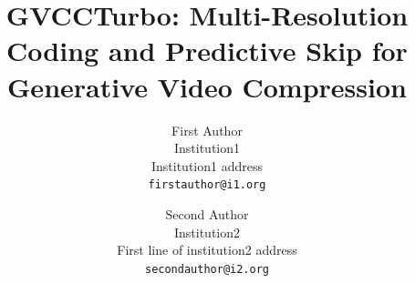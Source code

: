 \documentclass[10pt,twocolumn,letterpaper]{article}
\title{GVCCTurbo: Multi-Resolution Coding and Predictive Skip for Generative Video Compression}
\author{First Author\\
Institution1\\
Institution1 address\\
{\tt\small firstauthor@i1.org}
\and
Second Author\\
Institution2\\
First line of institution2 address\\
{\tt\small secondauthor@i2.org}
}
\begin{document}
\maketitle








{
    \small
    
    
}
\end{document}
